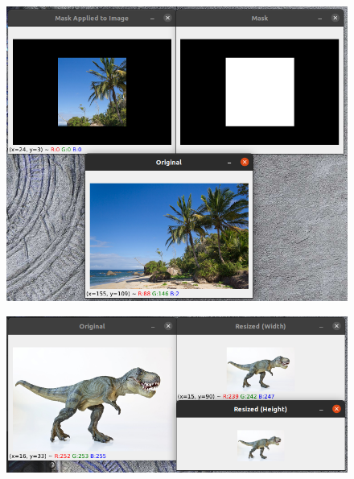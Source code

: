 \documentclass[12pt,letterpaper]{article}
\begin{document}
\begin{multicols}{2}
\begin{figure}[H]
\centering
\includegraphics[width = \columnwidth]{Resultado_ch6_7.png}
\end{figure}

\begin{figure}[H]
\centering
\includegraphics[width = \columnwidth]{Resultado_ch6_8.png}
\end{figure}


\end{multicols}
\end{document}
